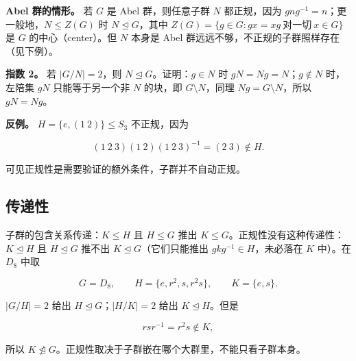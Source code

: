 \textbf{Abel 群的情形。} 若 $G$ 是 Abel 群，则任意子群 $N$ 都正规，因为 $gng^{-1}=n$；更一般地，$N\le Z(G)$ 时 $N\trianglelefteq G$，其中 $Z(G)=\{g\in G:gx=xg\ \text{对一切}\ x\in G\}$ 是 $G$ 的中心（center）。但 $N$ 本身是 Abel 群远远不够，不正规的子群照样存在（见下例）。

\textbf{指数 2。} 若 $|G/N|=2$，则 $N\trianglelefteq G$。证明：$g\in N$ 时 $gN=Ng=N$；$g\notin N$ 时，左陪集 $gN$ 只能等于另一个非 $N$ 的块，即 $G\setminus N$，同理 $Ng=G\setminus N$，所以 $gN=Ng$。

\textbf{反例。} $H=\{e,(1\ 2)\}\le S_3$ 不正规，因为

\[(1\ 2\ 3)(1\ 2)(1\ 2\ 3)^{-1}=(2\ 3)\notin H.\]

可见正规性是需要验证的额外条件，子群并不自动正规。

\subsection{传递性}


子群的包含关系传递：$K\le H$ 且 $H\le G$ 推出 $K\le G$。正规性没有这种传递性：$K\trianglelefteq H$ 且 $H\trianglelefteq G$ 推不出 $K\trianglelefteq G$（它们只能推出 $gkg^{-1}\in H$，未必落在 $K$ 中）。在 $D_8$ 中取

\[G=D_8,\qquad H=\{e,r^2,s,r^2s\},\qquad K=\{e,s\}.\]

$|G/H|=2$ 给出 $H\trianglelefteq G$；$|H/K|=2$ 给出 $K\trianglelefteq H$。但是

\[rsr^{-1}=r^2s\notin K,\]

所以 $K\not\trianglelefteq G$。正规性取决于子群嵌在哪个大群里，不能只看子群本身。

